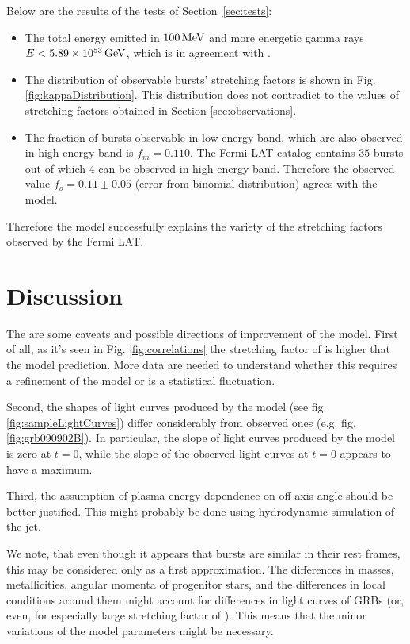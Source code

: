 \documentclass[manuscript]{aastex}
\begin{document}
Below are the results of the tests of Section~\ref{sec:tests}:
\begin{itemize}
	\item{ The total energy emitted in $\unit[100]{MeV}$ and more
          energetic gamma rays $E < \unit[5.89 \times 10^{53}]{GeV}$,
          which is in agreement with \citet{Gehrels:2013xd}.  }
	\item{ The distribution of observable bursts' stretching
          factors is shown in Fig. \ref{fig:kappaDistribution}.  This
          distribution does not contradict to the values of stretching
          factors obtained in Section \ref{sec:observations}.  }
	\item{ The fraction of bursts observable in low energy band,
          which are also observed in high energy band is $f_m = 0.110$.
          The Fermi-LAT catalog contains $35$ bursts out of which $4$
          can be observed in high energy band.  Therefore the observed
          value $f_o = 0.11 \pm 0.05$ (error from binomial
          distribution) agrees with the model.  }
\end{itemize}

Therefore the model successfully explains the variety of the
stretching factors observed by the Fermi LAT.

\section{Discussion}

The are some caveats and possible directions of improvement of the
model. First of all, as it's seen in Fig. \ref{fig:correlations} the
stretching factor of  is higher that the model
prediction. More data are needed to understand whether this requires a
refinement of the model or is a statistical fluctuation.

Second, the shapes of light curves produced by the model (see
fig. \ref{fig:sampleLightCurves}) differ considerably from observed
ones (e.g. fig. \ref{fig:grb090902B}). In particular, the slope of
light curves produced by the model is zero at $t = 0$, while the slope
of the observed light curves at $t = 0$ appears to have a maximum.

Third, the assumption of plasma energy dependence on off-axis angle
should be better justified.  This might probably be done using
hydrodynamic simulation of the jet.

We note, that even though it appears that bursts are similar in their
rest frames, this may be considered only as a first approximation.
The differences in masses, metallicities, angular momenta of
progenitor stars, and the differences in local conditions around them
might account for differences in light curves of GRBs (or, even, for
especially large stretching factor of ).  This means that
the minor variations of the model parameters might be necessary.
\end{document}
